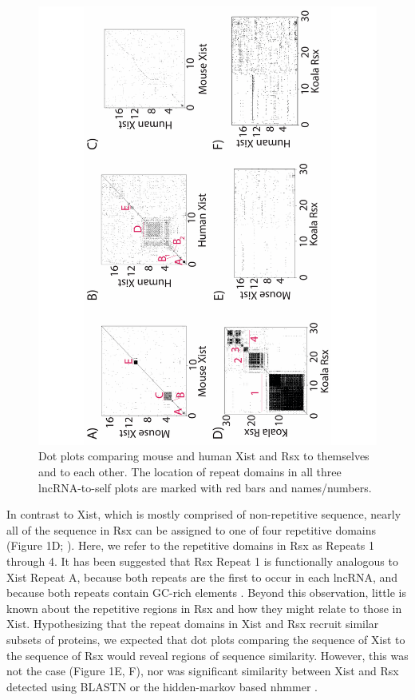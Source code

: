 \begin{figure}[!h]
\centering
\includegraphics[angle=-90, width=\textwidth]{images/fig1-v2-01.pdf}
\caption[\emph{Xist} and \emph{Rsx} dot plots]{Dot plots comparing mouse and human Xist and Rsx to themselves and to each other. The location of repeat domains in all three lncRNA-to-self plots are marked with red bars and names/numbers.}
\end{figure}

In contrast to Xist, which is mostly comprised of non-repetitive sequence, nearly all of the sequence in Rsx can be assigned to one of four repetitive domains (Figure 1D; \cite{Johnson2018AdaptationGenome}). Here, we refer to the repetitive domains in Rsx as Repeats 1 through 4. It has been suggested that Rsx Repeat 1 is functionally analogous to Xist Repeat A, because both repeats are the first to occur in each lncRNA, and because both repeats contain GC-rich elements \cite{Grant2012RsxInactivation,Johnson2018AdaptationGenome}. Beyond this observation, little is known about the repetitive regions in Rsx and how they might relate to those in Xist. Hypothesizing that the repeat domains in Xist and Rsx recruit similar subsets of proteins, we expected that dot plots comparing the sequence of Xist to the sequence of Rsx would reveal regions of sequence similarity. However, this was not the case (Figure 1E, F), nor was significant similarity between Xist and Rsx detected using BLASTN or the hidden-markov based nhmmer \cite{Altschul1990BasicTool,Wheeler2013Nhmmer:HMMs}. 

